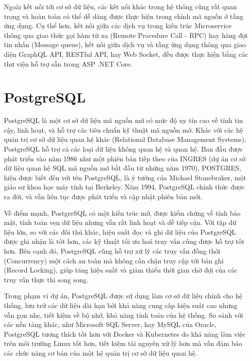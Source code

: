 \documentclass[../DoAn.tex]{subfiles}
\begin{document}
Ngoài kết nối tới cơ sở dữ liệu, các kết nối khác trong hệ thống cũng rất quan trọng và hoàn toàn có thể dễ dàng được thực hiện trong chính mã nguồn
ở tầng ứng dụng. Cụ thể hơn, kết nối giữa các dịch vụ trong kiến trúc Microservice thông qua giao thức gọi hàm từ xa (Remote Procedure Call - RPC) hay hàng đợi tin nhắn (Message queue),
kết nối giữa dịch vụ và tầng ứng dụng thông qua giao diện GraphQL API, RESTful API, hay Web Socket, đều được thực hiện bằng các thư viện hỗ trợ sẵn
trong ASP .NET Core.


\section{PostgreSQL}
\label{section:3.4}
PostgreSQL là một cơ sở dữ liệu mã nguồn mở có mức độ uy tín cao về tính tin cậy, linh hoạt, và hỗ trợ các tiêu chuẩn kỹ thuật mã nguồn mở.
Khác với các hệ quản trị cơ sở dữ liệu quan hệ khác (Relational Database Management Systems), PostgreSQL hỗ trợ cả các loại dữ liệu không quan hệ
và quan hệ. Ban đầu được phát triển vào năm 1986 như một phiên bản tiếp theo của INGRES (dự án cơ sở dữ liệu quan hệ SQL mã nguồn mở bắt đầu từ những năm 1970),
POSTGRES, hiện được biết đến với tên PostgreSQL, là ý tưởng của Michael Stonebraker, một giáo sư khoa học máy tính tại Berkeley. Năm 1994, PostgreSQL chính thức
được ra đời, và vẫn liên tục được phát triển và cập nhật phiên bản mới.\cite{PostgresIBM}

Về điểm mạnh, PostgreSQL có một kiến trúc mở, được kiểm chứng về tính bảo mật, tính toàn vẹn dữ liệu nhưng vẫn rất linh hoạt và dễ tiếp cận. Với tập
dữ liệu lớn, so với các đối thủ khác, hiệu suất đọc và ghi dữ liệu của PostgreSQL được ghi nhận là tốt hơn, các kỹ thuật tối ưu hoá truy vấn
cũng được hỗ trợ tốt hơn. Bên cạnh đó, PostgreSQL cũng hỗ trợ xử lý các truy vấn đồng thời (Concurrency) một cách an toàn mà không cần chặn
truy cập tới bản ghi (Record Locking), giúp tăng hiệu suất và giảm thiểu thời gian chờ đợi của các truy vấn thực thi song song.\cite{PostgresIBM}

Trong phạm vi dự án, PostgreSQL được sử dụng làm cơ sở dữ liệu chính cho hệ thống, lưu trữ các dữ liệu dài hạn bởi khả năng cung cấp hiệu suất cao
nhưng vẫn gọn nhẹ, tiết kiệm về bộ nhớ, khả năng tính toán của hệ thống. So sánh với các nền tảng khác, như Microsoft SQL Server, hay MySQL của Oracle,
PostgreSQL tương thích tốt hơn với Docker và Kubernetes do khả năng làm việc trên môi trường Linux tốt hơn, tiết kiệm tài nguyên xử lý hơn mà
vẫn đảm bảo các chức năng cơ bản của một hệ quản trị cơ sở dữ liệu quan hệ.
\end{document}
